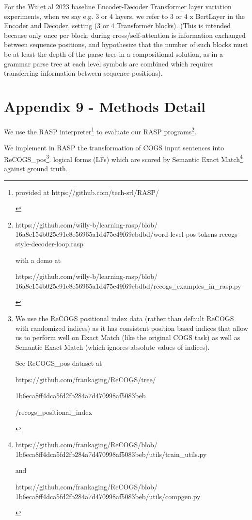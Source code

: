 \documentclass[11pt]{article}
\begin{document}
For the Wu et al 2023 baseline Encoder-Decoder Transformer layer variation experiments, 
when we say e.g. 3 or 4 layers, we refer to 3 or 4 x BertLayer in the Encoder and Decoder, setting (3 or 4 Transformer blocks).
(This is intended because only once per block, during cross/self-attention is information exchanged between sequence positions, and \cite{Csordas2022} hypothesize that the number of such blocks must be at least the depth of the parse tree in a compositional solution, as in a grammar parse tree at each level symbols are combined which requires transferring information between sequence positions).
\clearpage

\section{Appendix 9 - Methods Detail}

We use the RASP \cite{Weiss2021} interpreter\footnote{
\begin{tiny}
provided at https://github.com/tech-srl/RASP/
\end{tiny}
} to evaluate our RASP programs\footnote{
\begin{tiny}
https://github.com/willy-b/learning-rasp/blob/
16a8e154b025e91c8e56965a1d475e49f69ebdbd/word-level-pos-tokens-recogs-style-decoder-loop.rasp

with a demo at

https://github.com/willy-b/learning-rasp/blob/
16a8e154b025e91c8e56965a1d475e49f69ebdbd/recogs\_examples\_in\_rasp.py 
\end{tiny}
}.

We implement in RASP the transformation of COGS input sentences into ReCOGS\_pos\footnote{
We use the ReCOGS positional index data (rather than default ReCOGS with randomized indices) as it has consistent position based indices that allow us to perform well on Exact Match (like the original COGS task) as well as Semantic Exact Match (which ignores absolute values of indices).
\begin{tiny}

See ReCOGS\_pos dataset at 

https://github.com/frankaging/ReCOGS/tree/

1b6eca8ff4dca5fd2fb284a7d470998af5083beb

/recogs\_positional\_index 
\end{tiny}
}. logical forms (LFs) which are scored by Semantic Exact Match\footnote{ 
\begin{tiny}
https://github.com/frankaging/ReCOGS/blob/
1b6eca8ff4dca5fd2fb284a7d470998af5083beb/utils/train\_utils.py

and

https://github.com/frankaging/ReCOGS/blob/
1b6eca8ff4dca5fd2fb284a7d470998af5083beb/utils/compgen.py
\end{tiny}
} against ground truth.
\end{document}
